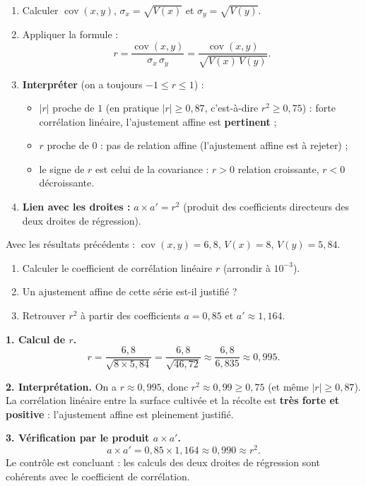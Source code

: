 \documentclass[11pt]{article}
\begin{document}
\begin{methode}
\begin{enumerate}
\item Calculer $\operatorname{cov}(x,y)$, $\sigma_x=\sqrt{V(x)}$ et $\sigma_y=\sqrt{V(y)}$.
\item Appliquer la formule :
\[ r=\frac{\operatorname{cov}(x,y)}{\sigma_x\,\sigma_y}=\frac{\operatorname{cov}(x,y)}{\sqrt{V(x)\,V(y)}}. \]
\item \textbf{Interpréter} (on a toujours $-1\le r\le 1$) :
\begin{itemize}
\item $|r|$ proche de $1$ (en pratique $|r|\ge 0{,}87$, c'est-à-dire $r^2\ge 0{,}75$) : forte corrélation linéaire, l'ajustement affine est \textbf{pertinent} ;
\item $r$ proche de $0$ : pas de relation affine (l'ajustement affine est à rejeter) ;
\item le signe de $r$ est celui de la covariance : $r>0$ relation croissante, $r<0$ décroissante.
\end{itemize}
\item \textbf{Lien avec les droites :} $a\times a'=r^2$ (produit des coefficients directeurs des deux droites de régression).
\end{enumerate}
\end{methode}

\begin{exoresolu}
Avec les résultats précédents : $\operatorname{cov}(x,y)=6{,}8$, $V(x)=8$, $V(y)=5{,}84$.
\begin{enumerate}
\item Calculer le coefficient de corrélation linéaire $r$ (arrondir à $10^{-3}$).
\item Un ajustement affine de cette série est-il justifié ?
\item Retrouver $r^2$ à partir des coefficients $a=0{,}85$ et $a'\approx 1{,}164$.
\end{enumerate}
\tcblower
\textbf{1. Calcul de $r$.}
\[ r=\frac{6{,}8}{\sqrt{8\times 5{,}84}}=\frac{6{,}8}{\sqrt{46{,}72}}\approx \frac{6{,}8}{6{,}835}\approx 0{,}995. \]

\textbf{2. Interprétation.} On a $r\approx 0{,}995$, donc $r^2\approx 0{,}99\ge 0{,}75$ (et même $|r|\ge 0{,}87$). La corrélation linéaire entre la surface cultivée et la récolte est \textbf{très forte et positive} : l'ajustement affine est pleinement justifié.

\textbf{3. Vérification par le produit $a\times a'$.}
\[ a\times a'=0{,}85\times 1{,}164\approx 0{,}990\approx r^2. \]
Le contrôle est concluant : les calculs des deux droites de régression sont cohérents avec le coefficient de corrélation.
\end{exoresolu}
\end{document}
